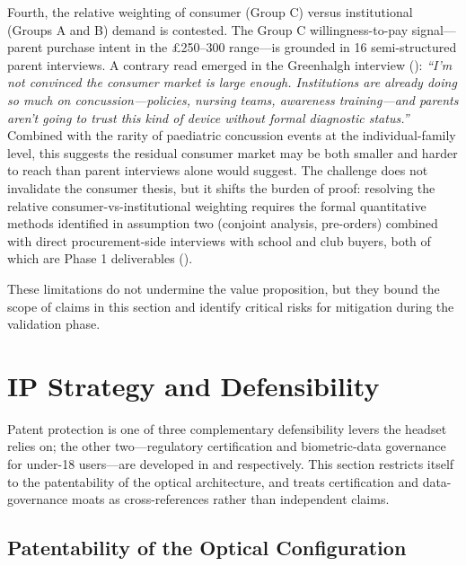 Fourth, the relative weighting of consumer (Group C) versus institutional (Groups A and B) demand is contested. The Group C willingness-to-pay signal---parent purchase intent in the \pounds 250--300 range---is grounded in 16 semi-structured parent interviews. A contrary read emerged in the Greenhalgh interview (): \textit{``I'm not convinced the consumer market is large enough. Institutions are already doing so much on concussion---policies, nursing teams, awareness training---and parents aren't going to trust this kind of device without formal diagnostic status.''} Combined with the rarity of paediatric concussion events at the individual-family level, this suggests the residual consumer market may be both smaller and harder to reach than parent interviews alone would suggest. The challenge does not invalidate the consumer thesis, but it shifts the burden of proof: resolving the relative consumer-vs-institutional weighting requires the formal quantitative methods identified in assumption two (conjoint analysis, pre-orders) combined with direct procurement-side interviews with school and club buyers, both of which are Phase 1 deliverables ().

These limitations do not undermine the value proposition, but they bound the scope of claims in this section and identify critical risks for mitigation during the validation phase.


\section{IP Strategy and Defensibility}
\label{sec:ent-ip}

Patent protection is one of three complementary defensibility levers the headset relies on; the other two---regulatory certification and biometric-data governance for under-18 users---are developed in  and  respectively. This section restricts itself to the patentability of the optical architecture, and treats certification and data-governance moats as cross-references rather than independent claims.


\subsection{Patentability of the Optical Configuration}
\label{sec:ent-patentability}

